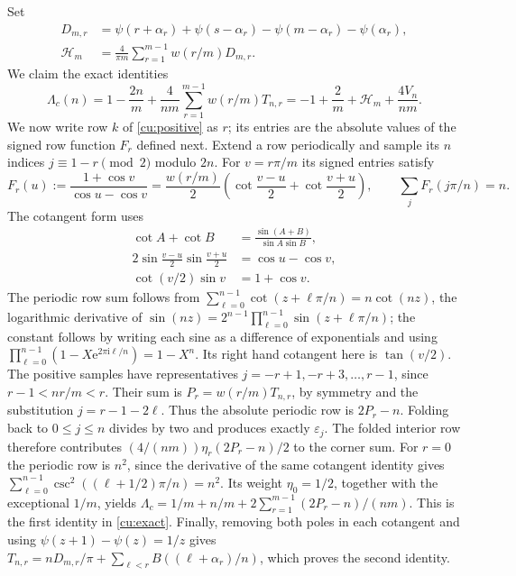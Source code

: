 Set
\begin{equation}\label{cu:D}
 \begin{aligned}
 D_{m,r}&=\psi(r+\alpha_r)+\psi(s-\alpha_r)
          -\psi(m-\alpha_r)-\psi(\alpha_r),\\
 \mathcal H_m&=\frac4{\pi m}\sum_{r=1}^{m-1}w(r/m)D_{m,r}.
 \end{aligned}
\end{equation}
We claim the exact identities
\begin{equation}\label{cu:exact}
 \Lambda_c(n)=1-\frac{2n}{m}+\frac4{nm}\sum_{r=1}^{m-1}w(r/m)T_{n,r}
       =-1+\frac2m+\mathcal H_m+\frac{4V_n}{nm}.
\end{equation}
We now write row $k$ of \eqref{cu:positive} as $r$; its entries are the absolute values of the signed row function $F_r$
defined next. Extend a row periodically
and sample its $n$ indices $j\equiv1-r\pmod2$ modulo $2n$. For
$v=r\pi/m$ its signed entries satisfy
\[
 F_r(u):=\frac{1+\cos v}{\cos u-\cos v}
   =\frac{w(r/m)}2\left(\cot\frac{v-u}{2}+\cot\frac{v+u}{2}\right),
 \qquad \sum_jF_r(j\pi/n)=n.
\]
The cotangent form uses
\[
 \begin{aligned}
 \cot A+\cot B&=\frac{\sin(A+B)}{\sin A\sin B},\\
 2\sin\frac{v-u}{2}\sin\frac{v+u}{2}&=\cos u-\cos v,\\
 \cot(v/2)\sin v&=1+\cos v.
 \end{aligned}
\]
The periodic row sum follows from
$\sum_{\ell=0}^{n-1}\cot(z+\ell\pi/n)=n\cot(nz)$, the logarithmic
derivative of
$\sin(nz)=2^{n-1}\prod_{\ell=0}^{n-1}\sin(z+\ell\pi/n)$;
the constant follows by writing each sine as a difference of exponentials
and using $\prod_{\ell=0}^{n-1}(1-X\mathrm e^{2\pi\mathrm i\ell/n})=1-X^n$.
Its right hand cotangent here is
$\tan(v/2)$. The positive samples have representatives
$j=-r+1,-r+3,\ldots,r-1$, since $r-1<nr/m<r$.
Their sum is $P_r=w(r/m)T_{n,r}$, by symmetry and the substitution
$j=r-1-2\ell$. Thus the absolute periodic row is $2P_r-n$.
Folding back to $0\leq j\leq n$ divides by two and produces exactly
$\varepsilon_j$. The folded interior row therefore contributes
$(4/(nm))\eta_r(2P_r-n)/2$ to the corner sum. For $r=0$ the periodic row is $n^2$, since the derivative
of the same cotangent identity gives
$\sum_{\ell=0}^{n-1}\csc^2((\ell+1/2)\pi/n)=n^2$.
Its weight $\eta_0=1/2$, together with the exceptional $1/m$, yields
$\Lambda_c=1/m+n/m+2\sum_{r=1}^{m-1}(2P_r-n)/(nm)$.
This is the first identity in \eqref{cu:exact}. Finally, removing both
poles in each cotangent and using $\psi(z+1)-\psi(z)=1/z$ gives
$T_{n,r}=nD_{m,r}/\pi+\sum_{\ell<r}B((\ell+\alpha_r)/n)$,
which proves the second identity.

